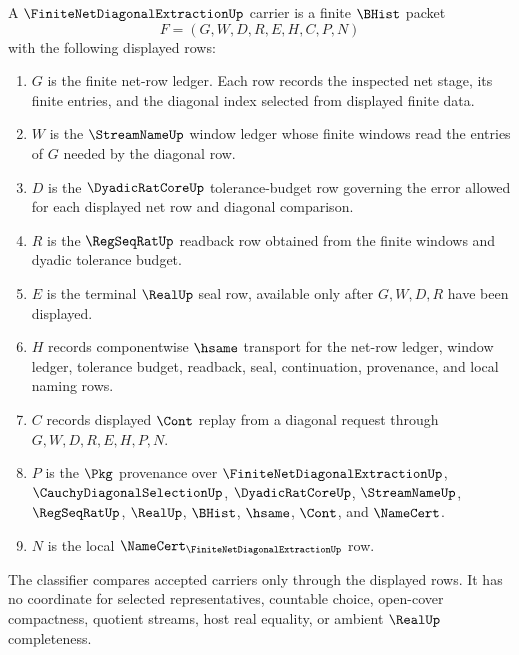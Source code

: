 \begin{definition}
\label{def:finite-net-diagonal-extraction-carrier}
A $\FiniteNetDiagonalExtractionUp$ carrier is a finite $\BHist$ packet
$$
F=(G,W,D,R,E,H,C,P,N)
$$
with the following displayed rows:
\begin{enumerate}
\item $G$ is the finite net-row ledger. Each row records the inspected net
stage, its finite entries, and the diagonal index selected from displayed
finite data.
\item $W$ is the $\StreamNameUp$ window ledger whose finite windows read the
entries of $G$ needed by the diagonal row.
\item $D$ is the $\DyadicRatCoreUp$ tolerance-budget row governing the error
allowed for each displayed net row and diagonal comparison.
\item $R$ is the $\RegSeqRatUp$ readback row obtained from the finite windows
and dyadic tolerance budget.
\item $E$ is the terminal $\RealUp$ seal row, available only after $G,W,D,R$
have been displayed.
\item $H$ records componentwise $\hsame$ transport for the net-row ledger,
window ledger, tolerance budget, readback, seal, continuation, provenance, and
local naming rows.
\item $C$ records displayed $\Cont$ replay from a diagonal request through
$G,W,D,R,E,H,P,N$.
\item $P$ is the $\Pkg$ provenance over $\FiniteNetDiagonalExtractionUp$,
$\CauchyDiagonalSelectionUp$, $\DyadicRatCoreUp$, $\StreamNameUp$,
$\RegSeqRatUp$, $\RealUp$, $\BHist$, $\hsame$, $\Cont$, and $\NameCert$.
\item $N$ is the local $\NameCert_{\FiniteNetDiagonalExtractionUp}$ row.
\end{enumerate}
The classifier compares accepted carriers only through the displayed rows. It
has no coordinate for selected representatives, countable choice, open-cover
compactness, quotient streams, host real equality, or ambient $\RealUp$
completeness.
\end{definition}

